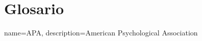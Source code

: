 \chapter{Glosario}

{
    name=APA,
    description={American Psychological Association}
}
\clearpage
\printglossary